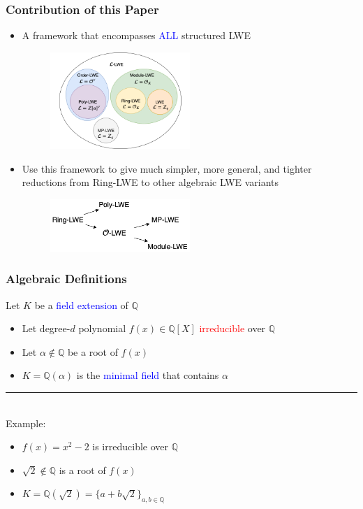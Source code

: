 \documentclass{beamer}
\newcommand{\blue}[1]{\textcolor{blue}{#1}}
\newcommand{\dgreen}[1]{\textcolor{dgreen}{#1}}
\newcommand{\red}[1]{\textcolor{red}{#1}}
\newcommand{\bbQ}{\mathbb{Q}}
\begin{document}
\frame
{
  \frametitle{Contribution of this Paper}
  \begin{itemize}
  	\item A framework that encompasses \blue{ALL} structured LWE
  	\begin{figure}[ht!]
  	\includegraphics[width=0.5\textwidth]{files/L-LWE.png}
  	\end{figure}

  	\item Use this framework to give much \dgreen{simpler}, \dgreen{more general}, and \dgreen{tighter} reductions from Ring-LWE to other algebraic LWE variants
  	\begin{figure}[ht!]
  	\includegraphics[width=0.5\textwidth]{files/LWE-Reductions.png}
  	\end{figure}

  \end{itemize}
}

\frame
{
  \frametitle{Algebraic Definitions}
  Let $K$ be a \blue{field extension} of $\bbQ$
  \begin{itemize}
  	\item Let degree-$d$ polynomial $f(x)\in\bbQ[X]$ \red{irreducible} over $\bbQ$
  	\item Let $\alpha\notin\bbQ$ be a \dgreen{root} of $f(x)$
  	\item $K=\bbQ(\alpha)$ is the \blue{minimal field} that contains $\alpha$
  \end{itemize}

  \noindent\rule{6cm}{0.4pt}\\
  Example:
  \begin{itemize}
  	\item $f(x)=x^2-2$ is irreducible over $\bbQ$
  	\item $\sqrt{2}\notin\bbQ$ is a root of $f(x)$
  	\item $K=\bbQ(\sqrt{2})=\{a+b\sqrt{2}\}_{a,b\in\bbQ}$
  \end{itemize}
}
\end{document}
